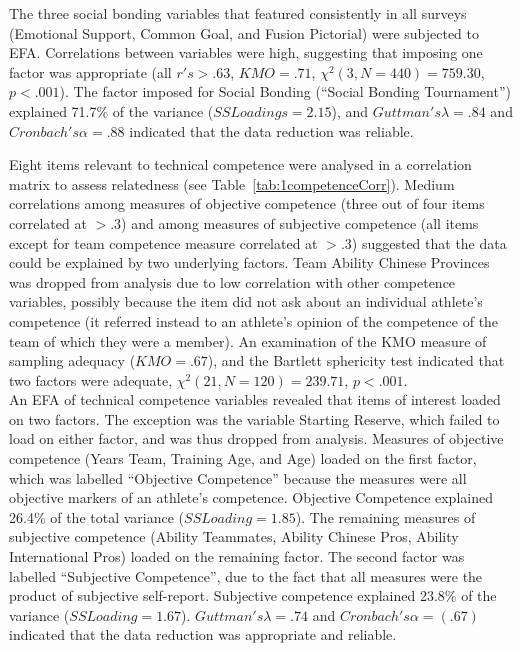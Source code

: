\begin{CJK}{UTF8}{gbsn}
The three social bonding variables that featured consistently in all surveys (Emotional Support, Common Goal, and Fusion Pictorial) were subjected to EFA.  Correlations between variables were high, suggesting that imposing one factor was appropriate (all $r's > .63$, $KMO = .71$, $\chi^2(3, N = 440) =  759.30$, $p < .001$).  The factor imposed for Social Bonding (``Social Bonding Tournament'') explained 71.7\% of the variance ($SS Loadings =  2.15$), and $Guttman's \lambda =.84$ and $Cronbach's \alpha= .88$ indicated that the data reduction was reliable.


Eight items relevant to technical competence were analysed in a correlation matrix to assess relatedness (see Table~\ref{tab:1competenceCorr}). Medium correlations among measures of objective competence (three out of four items correlated at $> .3$) and among measures of subjective competence (all items except for team competence measure correlated at $> .3$) suggested that the data could be explained by two underlying factors. Team Ability Chinese Provinces was dropped from analysis due to low correlation with other competence variables, possibly because the item did not ask about an individual athlete’s competence (it referred instead to an athlete’s opinion of the competence of the team of which they were a member). An examination of the KMO measure of sampling adequacy ($KMO = .67$), and the Bartlett sphericity test indicated that two factors were adequate, $\chi^2(21, N = 120) = 239.71$, $p < .001$. \\

An EFA of technical competence variables revealed that items of interest loaded on two factors. The exception was the variable Starting Reserve, which failed to load on either factor, and was thus dropped from analysis. Measures of objective competence (Years Team, Training Age, and Age) loaded on the first factor, which was labelled ``Objective Competence'' because the measures were all objective markers of an athlete's competence.  Objective Competence explained 26.4\% of the total variance ($SS Loading = 1.85$). The remaining measures of subjective competence (Ability Teammates, Ability Chinese Pros, Ability International Pros) loaded on the remaining factor.  The second factor was labelled ``Subjective Competence'', due to the fact that all measures were the product of subjective self-report.  Subjective competence explained 23.8\% of the variance ($SS Loading = 1.67$). $Guttman's \lambda =.74$ and $Cronbach's \alpha = (.67)$ indicated that the data reduction was appropriate and reliable.


\end{CJK}
